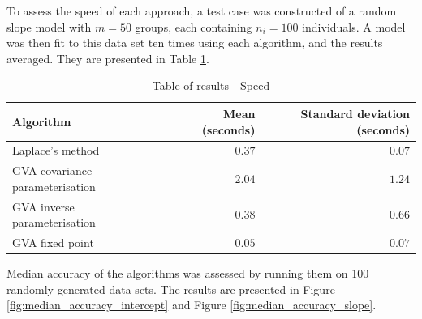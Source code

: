 To assess the speed of each approach, a test case was constructed of a random
slope model with $m=50$ groups, each containing $n_i = 100$ individuals. A
model was then fit to this data set ten times using each algorithm, and the
results averaged. They are presented in Table
\ref{tab:application_slope_speed}.

\begin{table}
	\begin{tabular}{|l|rr|}
		\hline
		Algorithm & Mean (seconds) & Standard deviation (seconds) \\
		\hline
		Laplace's method & $0.37$ & $0.07$ \\
		GVA covariance parameterisation & $2.04$ & $1.24$ \\
		GVA inverse parameterisation & $0.38$ & $0.66$ \\
		GVA fixed point & $0.05$ & $0.07$ \\
		\hline
	\end{tabular}
	\caption{Table of results - Speed}
	\label{tab:application_slope_speed}
\end{table}

		
Median accuracy of the algorithms was assessed by running them on 100 randomly
generated data sets. The	results are presented in Figure
\ref{fig:median_accuracy_intercept} and Figure \ref{fig:median_accuracy_slope}.
		
